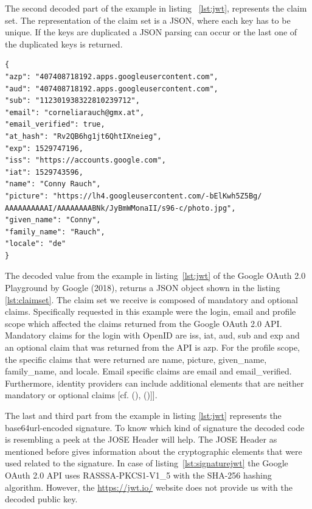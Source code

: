 The second decoded part of the example in listing ~\ref{lst:jwt}, represents the claim set. The representation of the claim set is a JSON, where each key has to be unique. If the keys are duplicated a JSON parsing can occur or the last one of the duplicated keys is returned. 
\pagebreak[4]

\begin{lstlisting}
{
"azp": "407408718192.apps.googleusercontent.com",
"aud": "407408718192.apps.googleusercontent.com",
"sub": "112301938322810239712",
"email": "corneliarauch@gmx.at",
"email_verified": true,
"at_hash": "Rv2QB6hg1jt6QhtIXneieg",
"exp": 1529747196,
"iss": "https://accounts.google.com",
"iat": 1529743596,
"name": "Conny Rauch",
"picture": "https://lh4.googleusercontent.com/-bElKwh5Z5Bg/
AAAAAAAAAAI/AAAAAAAABNk/JyBmWMonaII/s96-c/photo.jpg",
"given_name": "Conny",
"family_name": "Rauch",
"locale": "de"
}
\end{lstlisting}

The decoded value from the example in listing~\ref{lst:jwt} of the Google OAuth 2.0 Playground  by Google (2018), returns a JSON object shown in the listing \ref{lst:claimset}. The claim set we receive is composed of mandatory and optional claims. Specifically requested in this example were the login, email and profile scope which affected the claims returned from the Google OAuth 2.0 API. Mandatory claims for the login with OpenID are iss, iat, aud, sub and exp and an optional claim that was returned from the API is azp. For the profile scope, the specific claims that were returned are name, picture, given\_name, family\_name, and locale. Email specific claims are email and email\_verified. Furthermore, identity providers can include additional elements that are neither mandatory or optional claims [cf. ({\cite{Google:2018:OAuthPlayground}), (\cite{Siriwardena:JWTJWSJWE:2016})]}].

The last and third part from the example in listing \ref{lst:jwt}  represents the base64url-encoded signature. To know which kind of signature the decoded code is resembling a peek at the JOSE Header will help. The JOSE Header as mentioned before gives information about the cryptographic elements that were used related to the signature. In case of listing~\ref{lst:signaturejwt} the Google OAuth 2.0 API uses RASSSA-PKCS1-V1\_5 with the SHA-256 hashing algorithm. However, the \href{https://jwt.io/} {https://jwt.io/} website does not provide us with the decoded public key. 
\pagebreak[4]

